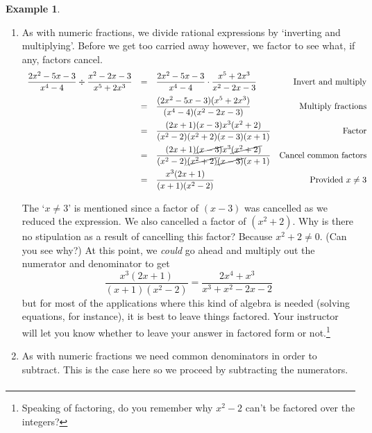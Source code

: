 \documentclass[11pt]{article}
\theoremstyle{definition}  %
\newtheorem{ex}{\bf Example}
\begin{document}
\begin{ex}
\begin{enumerate}

\item As with numeric fractions, we divide rational expressions by `inverting and multiplying'.  Before we get too carried away however, we factor to see what, if any, factors cancel.\[ \begin{array}{rclr}

\dfrac{2x^2-5x-3}{x^4 - 4} \div \dfrac{x^2-2x-3}{x^5 + 2x^3} & = & \dfrac{2x^2-5x-3}{x^4 - 4} \cdot \dfrac{x^5 + 2x^3}{x^2-2x-3} & \text{Invert and multiply} \\ [10pt]

& = & \dfrac{(2x^2-5x-3)(x^5 + 2x^3)}{(x^4 - 4)(x^2-2x-3)} & \text{Multiply fractions}  \\ [10pt]

& = & \dfrac{(2x+1)(x-3)x^3(x^2+2)}{(x^2-2)(x^2+2)(x-3)(x+1)} & \text{Factor} \\ [10pt]

& = & \dfrac{(2x+1)\cancel{(x-3)}x^3\cancel{(x^2+2)}}{(x^2-2)\cancel{(x^2+2)}\cancel{(x-3)}(x+1)} & \text{Cancel common factors} \\ [10pt]

& = & \dfrac{x^3(2x+1)}{(x+1)(x^2-2)} & \text{Provided $x \neq 3$} \\

\end{array}\]

The `$x \neq 3$' is mentioned since a factor of $(x-3)$ was cancelled as we reduced the expression.  We also cancelled a factor of $(x^2+2)$.  Why is there no stipulation as a result of cancelling this factor? Because $x^2 + 2 \neq 0$.  (Can you see why?)  At this point, we \textit{could} go ahead and multiply out the numerator and denominator to get \[\dfrac{x^3(2x+1)}{(x+1)(x^2-2)}  = \dfrac{2x^4 + x^3}{x^3+x^2-2x-2}\] but for most of the applications where this kind of algebra is needed (solving equations, for instance), it is best to leave things factored.  Your instructor will let you know whether to leave your answer in factored form or not.\footnote{Speaking of factoring, do you remember why $x^2-2$ can't be factored over the integers?}

\item  As with numeric fractions we need common denominators in order to subtract.  This is the case here so we proceed by subtracting the numerators. \[ \begin{array}{rclr}


\end{array}\]
\end{enumerate}
\end{ex}
\end{document}
